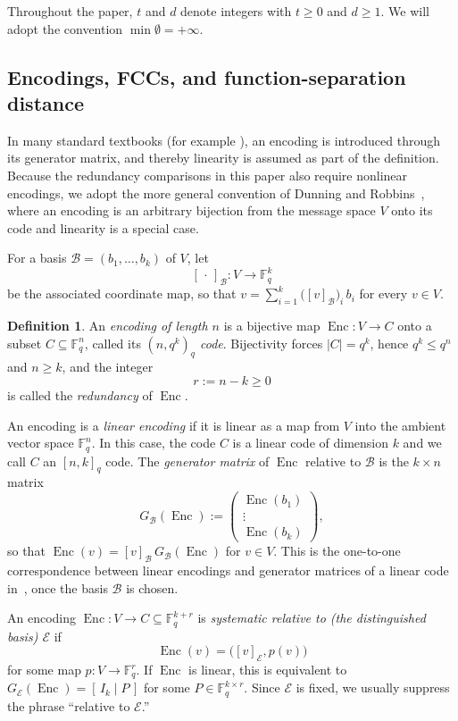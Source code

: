 \documentclass[a4paper,12pt]{article}
\theoremstyle{plain}
\theoremstyle{definition}
\newtheorem{definition}[lemma]{Definition}
\newcommand{\F}{\mathbb F}
\newcommand{\Enc}{\operatorname{Enc}}
\begin{document}
Throughout the paper, $t$ and $d$ denote integers with $t\geq0$ and $d\geq1$. We will adopt the convention $\min\emptyset=+\infty$.


\subsection{Encodings, FCCs, and function-separation distance}\label{sec:common}

In many standard textbooks (for example \cite{ding2018,huffman2003,lingxing2004,macwilliams1977}), an encoding is introduced through its generator matrix, and thereby   linearity is assumed as part of the definition.
Because the redundancy comparisons in this paper also
require nonlinear encodings, we adopt the more general convention of Dunning and Robbins~\cite{dunning1978}, where an encoding is an arbitrary bijection from the message space $V$ onto its code and linearity is a special case.

For a basis $\mathcal B=(b_1,\dots,b_k)$ of $V$, let
\[
[\,\cdot\,]_{\mathcal B}\colon V\longrightarrow\F_q^k
\]
be the associated coordinate map, so that
$v=\sum_{i=1}^k\bigl([v]_{\mathcal B}\bigr)_i\,b_i$ for every $v\in V$.

\begin{definition} \label{def:encodings}
An \emph{encoding of length $n$} is a bijective map
$\Enc\colon V\to C$ onto a subset $C\subseteq\F_q^n$, called its
\emph{$(n,q^k)_q$ code}. Bijectivity forces $|C|=q^k$, hence $q^k\le q^n$ and $n\ge k$, and the integer
\[
r:=n-k\ge0
\]
is called the \emph{redundancy} of $\Enc$.



An encoding is a \emph{linear encoding} if it is linear as a map from $V$ into the ambient vector space $\F_q^n$.
In this case, the code $C$ is  a linear code of dimension $k$ and we call $C$ an $[n,k]_q$ code. 
The \emph{generator matrix} of $\Enc$ relative to $\mathcal B$ is the
$k\times n$ matrix
\[
G_{\mathcal B}(\Enc)
:=
\begin{pmatrix}
\Enc(b_1)\\
\vdots\\
\Enc(b_k)
\end{pmatrix},
\]
so that
$\Enc(v)=[v]_{\mathcal B}\,G_{\mathcal B}(\Enc)$
for $v \in V$. This is the one-to-one correspondence  between linear encodings and   generator matrices of a linear code in~\cite{dunning1978}, once the basis $\mathcal B$ is chosen.

An encoding $\Enc\colon V\to C\subseteq\F_q^{k+r}$ is \emph{systematic relative
to (the distinguished basis) $\mathcal E$} if 
\[
\Enc(v)=\bigl([v]_{\mathcal E},p(v)\bigr)
\]
for some map $p\colon V\to\F_q^r$. 
If $\Enc$ is linear, this is equivalent to
$G_{\mathcal E}(\Enc)=[\,I_k\mid P\,]$ for some
$P\in\F_q^{k\times r}$.
Since $\mathcal E$ is fixed, we
usually suppress the phrase ``relative to $\mathcal E$.''
\end{definition}
 
\end{document}
